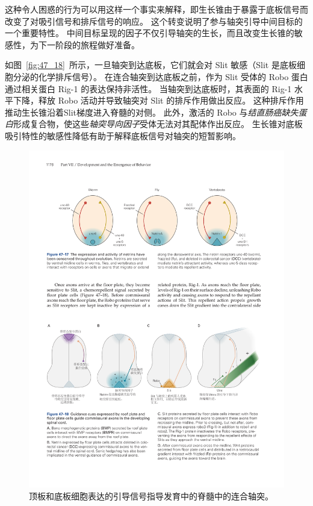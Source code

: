 这种令人困惑的行为可以用这样一个事实来解释，即生长锥由于暴露于底板信号而改变了对吸引信号和排斥信号的响应。
这个转变说明了参与轴突引导中间目标的一个重要特性。
中间目标呈现的因子不仅引导轴突的生长，而且改变生长锥的敏感性，为下一阶段的旅程做好准备。


如图~\ref{fig:47_18}~所示，一旦轴突到达底板，它们就会对 Slit 敏感（Slit 是底板细胞分泌的化学排斥信号）。
在连合轴突到达底板之前，作为 Slit 受体的 Robo 蛋白通过相关蛋白 Rig-1 的表达保持非活性。
当轴突到达底板时，其表面的 Rig-1 水平下降，释放 Robo 活动并导致轴突对 Slit 的排斥作用做出反应。
这种排斥作用推动生长锥沿着Slit梯度进入脊髓的对侧。
此外，激活的 Robo 与\textit{结直肠癌缺失蛋白}形成复合物，使这些\textit{轴突导向因子}受体无法对其配体作出反应。
生长锥对底板吸引特性的敏感性降低有助于解释底板信号对轴突的短暂影响。


\begin{figure}[htbp]
	\centering
	\includegraphics[width=1.0\linewidth]{chap47/fig_47_18}
	\caption{顶板和底板细胞表达的引导信号指导发育中的脊髓中的连合轴突。
}
\end{figure}
